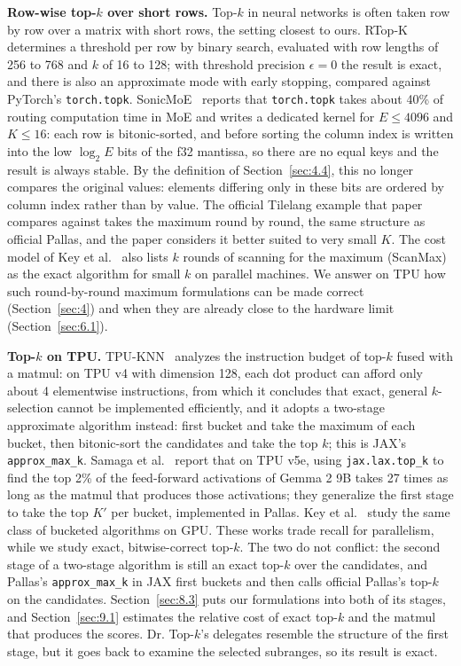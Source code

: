 \documentclass[sigconf,nonacm,balance=false]{acmart}
\newcommand{\code}[1]{\texttt{#1}}
\begin{document}
\textbf{Row-wise top-$k$ over short rows.} Top-$k$ in neural networks is often taken row by row over a matrix with short rows, the setting closest to ours. RTop-K~\cite{xie2025rtopk} determines a threshold per row by binary search, evaluated with row lengths of 256 to 768 and $k$ of 16 to 128; with threshold precision $\epsilon = 0$ the result is exact, and there is also an approximate mode with early stopping, compared against PyTorch's \code{torch.\allowbreak{}topk}. SonicMoE~\cite{guo2026sonicmoe} reports that \code{torch.\allowbreak{}topk} takes about 40\% of routing computation time in MoE and writes a dedicated kernel for $E \le 4096$ and $K \le 16$: each row is bitonic-sorted, and before sorting the column index is written into the low $\log_2 E$ bits of the f32 mantissa, so there are no equal keys and the result is always stable. By the definition of Section~\ref{sec:4.4}, this no longer compares the original values: elements differing only in these bits are ordered by column index rather than by value. The official Tilelang example that paper compares against takes the maximum round by round, the same structure as official Pallas, and the paper considers it better suited to very small $K$. The cost model of Key et al.~\cite{key2024approx} also lists $k$ rounds of scanning for the maximum (ScanMax) as the exact algorithm for small $k$ on parallel machines. We answer on TPU how such round-by-round maximum formulations can be made correct (Section~\ref{sec:4}) and when they are already close to the hardware limit (Section~\ref{sec:6.1}).

\textbf{Top-$k$ on TPU.} TPU-KNN~\cite{chern2022tpuknn} analyzes the instruction budget of top-$k$ fused with a matmul: on TPU v4 with dimension 128, each dot product can afford only about 4 elementwise instructions, from which it concludes that exact, general $k$-selection cannot be implemented efficiently, and it adopts a two-stage approximate algorithm instead: first bucket and take the maximum of each bucket, then bitonic-sort the candidates and take the top $k$; this is JAX's \code{approx\_\allowbreak{}max\_\allowbreak{}k}. Samaga et al.~\cite{samaga2026} report that on TPU v5e, using \code{jax.\allowbreak{}lax.\allowbreak{}top\_\allowbreak{}k} to find the top 2\% of the feed-forward activations of Gemma 2 9B takes 27 times as long as the matmul that produces those activations; they generalize the first stage to take the top $K'$ per bucket, implemented in Pallas. Key et al.~\cite{key2024approx} study the same class of bucketed algorithms on GPU. These works trade recall for parallelism, while we study exact, bitwise-correct top-$k$. The two do not conflict: the second stage of a two-stage algorithm is still an exact top-$k$ over the candidates, and Pallas's \code{approx\_\allowbreak{}max\_\allowbreak{}k} in JAX first buckets and then calls official Pallas's top-$k$ on the candidates. Section~\ref{sec:8.3} puts our formulations into both of its stages, and Section~\ref{sec:9.1} estimates the relative cost of exact top-$k$ and the matmul that produces the scores. Dr. Top-$k$'s delegates resemble the structure of the first stage, but it goes back to examine the selected subranges, so its result is exact.
\end{document}
